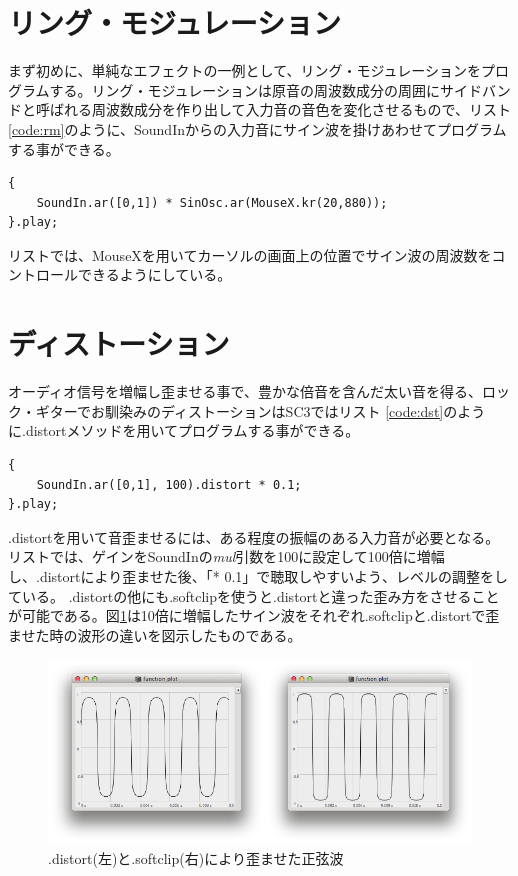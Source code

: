 \documentclass{jsarticle}
\begin{document}
\section{リング・モジュレーション}
まず初めに、単純なエフェクトの一例として、リング・モジュレーションをプログラムする。リング・モジュレーションは原音の周波数成分の周囲にサイドバンドと呼ばれる周波数成分を作り出して入力音の音色を変化させるもので、リスト\ref{code:rm}のように、SoundInからの入力音にサイン波を掛けあわせてプログラムする事ができる。

\begin{lstlisting}[caption=リング・モジュレーション,label=code:rm]
{
	SoundIn.ar([0,1]) * SinOsc.ar(MouseX.kr(20,880));
}.play;
\end{lstlisting}

リストでは、MouseXを用いてカーソルの画面上の位置でサイン波の周波数をコントロールできるようにしている。

\section{ディストーション}
オーディオ信号を増幅し歪ませる事で、豊かな倍音を含んだ太い音を得る、ロック・ギターでお馴染みのディストーションはSC3ではリスト
\ref{code:dst}のように.distortメソッドを用いてプログラムする事ができる。

\begin{lstlisting}[caption=ディストーション, label=code:dst]
{
	SoundIn.ar([0,1], 100).distort * 0.1;
}.play;
\end{lstlisting}

.distortを用いて音歪ませるには、ある程度の振幅のある入力音が必要となる。
リストでは、ゲインをSoundInの{\it mul}引数を100に設定して100倍に増幅し、.distortにより歪ませた後、「* 0.1」で聴取しやすいよう、レベルの調整をしている。
.distortの他にも.softclipを使うと.distortと違った歪み方をさせることが可能である。図\ref{fig:comparison}は10倍に増幅したサイン波をそれぞれ.softclipと.distortで歪ませた時の波形の違いを図示したものである。

\begin{figure}[htbp]
	\begin{center}
		\includegraphics[scale=0.6]{comparison.pdf}
	\end{center}
	\caption{.distort(左)と.softclip(右)により歪ませた正弦波}
	\label{fig:comparison}
\end{figure}
\end{document}
